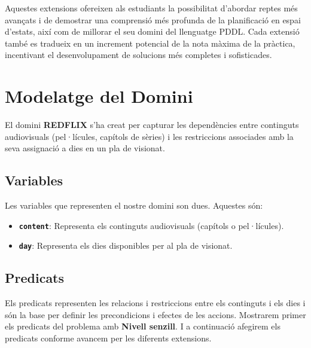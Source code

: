\documentclass[a4paper]{article}
\begin{document}
	Aquestes extensions ofereixen als estudiants la possibilitat d'abordar reptes més avançats i de demostrar una comprensió més profunda de la planificació en espai d'estats, així com de millorar el seu domini del llenguatge PDDL. Cada extensió també es tradueix en un increment potencial de la nota màxima de la pràctica, incentivant el desenvolupament de solucions més completes i sofisticades.
	
	\newpage
	\section{Modelatge del Domini}
	
	El domini \textbf{REDFLIX} s'ha creat per capturar les dependències entre continguts audiovisuals (pel·lícules, capítols de sèries) i les restriccions associades amb la seva assignació a dies en un pla de visionat.
	
	\subsection{Variables}
	
	Les variables que representen el nostre domini son dues. Aquestes són:
	
	\begin{itemize}
		\item \textbf{\texttt{content}}: Representa els continguts audiovisuals (capítols o pel·lícules).
		\item \textbf{\texttt{day}}: Representa els dies disponibles per al pla de visionat.
	\end{itemize}
	
	\subsection{Predicats}
	
	Els predicats representen les relacions i restriccions entre els continguts i els dies i són la base per definir les precondicions i efectes de les accions. Mostrarem primer els predicats del problema amb \textbf{Nivell senzill}. I a continuació afegirem els predicats conforme avancem per les diferents extensions.
	
\end{document}
